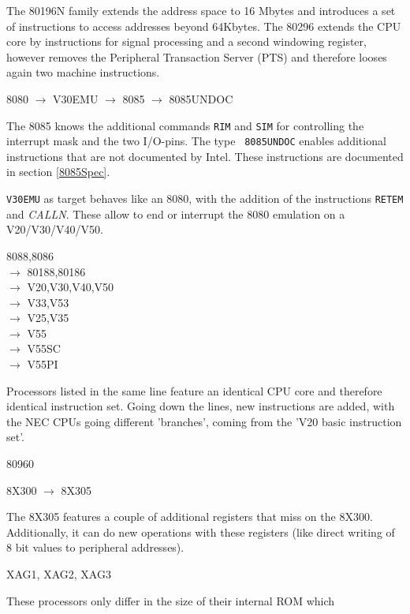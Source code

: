 \documentclass[12pt,twoside]{report}
\newcommand{\tty}[1]{{\tt #1}}
\begin{document}
The 80196N family extends the address space to 16 Mbytes and
introduces a set of instructions to access addresses beyond 64Kbytes.
The 80296 extends the CPU core by instructions for signal processing
and a second windowing register, however removes the Peripheral
Transaction Server (PTS) and therefore looses again two machine
instructions.
\begin{cpulist}
   8080 $\rightarrow$ V30EMU $\rightarrow$ 8085 $\rightarrow$ 8085UNDOC
\end{cpulist}
The 8085 knows the additional commands \tty{RIM} and \tty{SIM} for
controlling the interrupt mask and the two I/O-pins.  The type {\tt
8085UNDOC} enables additional instructions that are not documented
by Intel.  These instructions are documented in section \ref{8085Spec}.

{\tt V30EMU} as target behaves like an 8080, with the addition of
the instructions {\tt RETEM} and {\em CALLN}.  These allow to
end or interrupt the 8080 emulation on a V20/V30/V40/V50.
\begin{cpulist}
   8088,8086 \\
\> $\rightarrow$ 80188,80186 \\
\> $\rightarrow$ V20,V30,V40,V50 \\
\> $\rightarrow$ V33,V53 \\
\> $\rightarrow$ V25,V35 \\
\> $\rightarrow$ V55 \\
\> $\rightarrow$ V55SC \\
\> $\rightarrow$ V55PI
\end{cpulist}
Processors listed in the same line feature an identical CPU core and therefore
identical instruction set.  Going down the lines, new instructions are added, 
with the NEC CPUs going different 'branches', coming from the 'V20 basic
instruction set'.
\begin{cpulist}
   80960
\end{cpulist}
\begin{cpulist}
   8X300 $\rightarrow$ 8X305
\end{cpulist}
The 8X305 features a couple of additional registers that miss on the
8X300.  Additionally, it can do new operations with these registers
(like direct writing of 8 bit values to peripheral addresses).
\begin{cpulist}
   XAG1, XAG2, XAG3
\end{cpulist}
These processors only differ in the size of their internal ROM which
\end{document}
